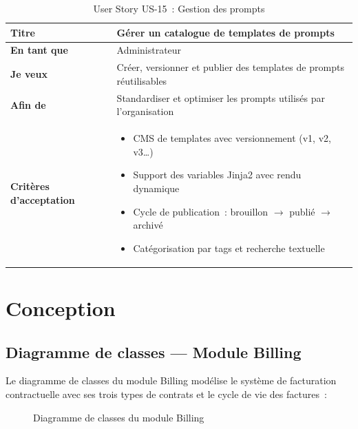 \begin{table}[H]
\centering
\caption{User Story US-15~: Gestion des prompts}
\label{tab:us15}
\begin{tabularx}{\textwidth}{|l|X|}
\hline
\textbf{Titre} & Gérer un catalogue de templates de prompts \\
\hline
\textbf{En tant que} & Administrateur \\
\hline
\textbf{Je veux} & Créer, versionner et publier des templates de prompts réutilisables \\
\hline
\textbf{Afin de} & Standardiser et optimiser les prompts utilisés par l'organisation \\
\hline
\textbf{Critères d'acceptation} & \begin{minipage}[t]{\linewidth}\vspace{2pt}
\begin{itemize}[noitemsep,topsep=0pt]
\item CMS de templates avec versionnement (v1, v2, v3\ldots)
\item Support des variables Jinja2 avec rendu dynamique
\item Cycle de publication~: brouillon $\rightarrow$ publié $\rightarrow$ archivé
\item Catégorisation par tags et recherche textuelle
\end{itemize}\vspace{2pt}
\end{minipage} \\
\hline
\end{tabularx}
\end{table}


\section{Conception}
\label{sec:s3_conception}

\subsection{Diagramme de classes --- Module Billing}

Le diagramme de classes du module Billing modélise le système de facturation contractuelle avec ses trois types de contrats et le cycle de vie des factures~:

\begin{figure}[H]
    \centering
    \caption{Diagramme de classes du module Billing}
    \label{fig:class_billing}
\end{figure}

